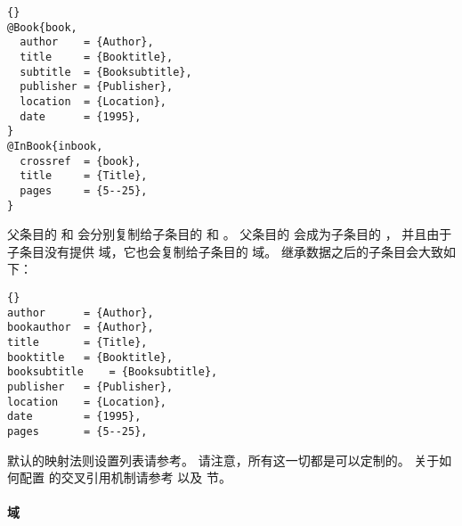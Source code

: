 \begin{lstlisting}[style=bibtex]{}
@Book{book,
  author	= {Author},
  title		= {Booktitle},
  subtitle	= {Booksubtitle},
  publisher	= {Publisher},
  location	= {Location},
  date		= {1995},
}
@InBook{inbook,
  crossref	= {book},
  title		= {Title},
  pages		= {5--25},
}
\end{lstlisting}
%
父条目的  和  会分别复制给子条目的  和 。
父条目的  会成为子条目的 ，
并且由于子条目没有提供  域，它也会复制给子条目的  域。
继承数据之后的子条目会大致如下：

\begin{lstlisting}[style=bibtex]{}
author	  	= {Author},
bookauthor	= {Author},
title		= {Title},
booktitle	= {Booktitle},
booksubtitle	= {Booksubtitle},
publisher	= {Publisher},
location	= {Location},
date		= {1995},
pages		= {5--25},
\end{lstlisting}
%
默认的映射法则设置列表请参考。
请注意，所有这一切都是可以定制的。
关于如何配置 \biber 的交叉引用机制请参考  以及  节。

\paragraph{ 域}%
\label{bib:cav:ref:ref}


